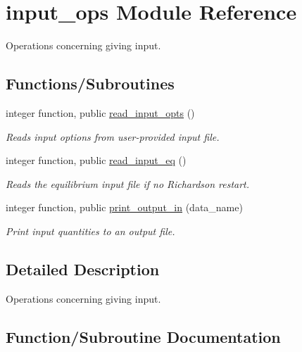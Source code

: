 \hypertarget{namespaceinput__ops}{}\section{input\+\_\+ops Module Reference}
\label{namespaceinput__ops}


Operations concerning giving input.  


\subsection*{Functions/\+Subroutines}
\begin{DoxyCompactItemize}
\item 
integer function, public \hyperlink{namespaceinput__ops_a434acca4f59f9dc1d91e04f846133684}{read\+\_\+input\+\_\+opts} ()
\begin{DoxyCompactList}\small\item\em Reads input options from user-\/provided input file. \end{DoxyCompactList}\item 
integer function, public \hyperlink{namespaceinput__ops_a577c897cc266961eb40bb5ef747fa077}{read\+\_\+input\+\_\+eq} ()
\begin{DoxyCompactList}\small\item\em Reads the equilibrium input file if no Richardson restart. \end{DoxyCompactList}\item 
integer function, public \hyperlink{namespaceinput__ops_a84ec7b3833da80ebb36ae0d5ff1a9e0a}{print\+\_\+output\+\_\+in} (data\+\_\+name)
\begin{DoxyCompactList}\small\item\em Print input quantities to an output file. \end{DoxyCompactList}\end{DoxyCompactItemize}


\subsection{Detailed Description}
Operations concerning giving input. 

\subsection{Function/\+Subroutine Documentation}
\mbox{\label{namespaceinput__ops_a84ec7b3833da80ebb36ae0d5ff1a9e0a}} 
